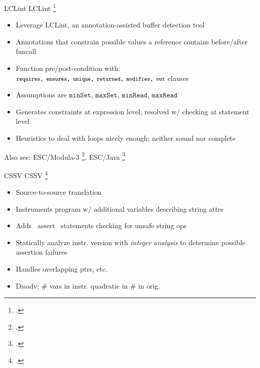 \documentclass[aspectratio=169]{beamer}
\begin{document}
\begin{frame}[fragile]{LCLint}
LCLint \footcite{larochelle_statically_2001}
\begin{itemize}
    \item Leverage LCLint, an annotation-assisted buffer detection tool
    \item Annotations that constrain possible values a reference contains before/after funcall
    \item Function pre/post-condition with: $\footnotesize{\texttt{requires, ensures, unique, returned, modifies, out}}$ clauses
    \item Assumptions are $\texttt{minSet, maxSet, minRead, maxRead}$
    \item Generates constraints at expression level, resolved w/ checking at statement level
    \item Heuristics to deal with loops nicely enough; neither sound nor complete
\end{itemize}
    Also see: ESC/Modula-3 \footcite{detlefs_overview_1995}, ESC/Java \footcite{flanagan_extended_2002}
    \vspace{0.2in}
\end{frame}

\begin{frame}{CSSV}
CSSV \footcite{dor_cssv:_2003}
\begin{itemize}
    \item Source-to-source translation
    \item Instruments program w/ additional variables describing string attrs
    \item Adds ~assert~ statements checking for unsafe string ops
    \item Statically analyze instr. version with \emph{integer analysis} to determine possible assertion failures
    \item Handles overlapping ptrs, etc.
    \item Disadv: \# vars in instr. quadratic in \# in orig.
\end{itemize}
\end{frame}
\end{document}
